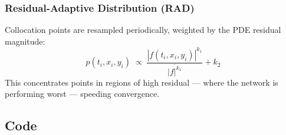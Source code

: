 \documentclass[11pt,a4paper]{article}
\begin{document}
\subsubsection*{Residual-Adaptive Distribution (RAD)}

Collocation points are resampled periodically, weighted by the PDE
residual magnitude:
\begin{equation}
  p(t_i,x_i,y_i) \;\propto\;
  \frac{|f(t_i,x_i,y_i)|^{k_1}}{\overline{|f|^{k_1}}} + k_2
\label{eq:rad}
\end{equation}
This concentrates points in regions of high residual --- where the
network is performing worst --- speeding convergence.

\subsection*{Code}
\end{document}
